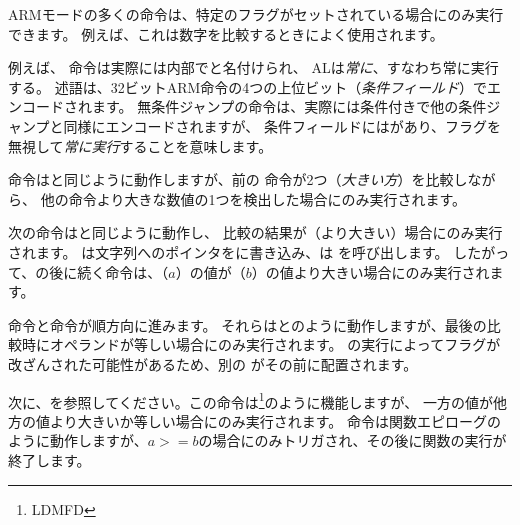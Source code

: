 \label{subsec:jcc_ARM}

\mysubparagraph{\OptimizingKeilVI (\ARMMode)}




ARMモードの多くの命令は、特定のフラグがセットされている場合にのみ実行できます。
例えば、これは数字を比較するときによく使用されます。


例えば、 \ADD 命令は実際には内部でと名付けられ、
ALは\emph{常に}、すなわち常に実行する。
述語は、32ビットARM命令の4つの上位ビット（\emph{条件フィールド}）でエンコードされます。
無条件ジャンプの命令は、実際には条件付きで他の条件ジャンプと同様にエンコードされますが、
条件フィールドにはがあり、フラグを無視して\emph{常に実行}することを意味します。


命令はと同じように動作しますが、前の \CMP 命令が2つ（\emph{大きい方}）を比較しながら、
他の命令より大きな数値の1つを検出した場合にのみ実行されます。


次の命令はと同じように動作し、
比較の結果が（より大きい）場合にのみ実行されます。 
は文字列へのポインタをに書き込み、は \printf を呼び出します。
したがって、の後に続く命令は、（$a$）の値が（$b$）の値より大きい場合にのみ実行されます。


命令と命令が順方向に進みます。
それらはとのように動作しますが、最後の比較時にオペランドが等しい場合にのみ実行されます。 
\printf の実行によってフラグが改ざんされた可能性があるため、別の \CMP がその前に配置されます。


次に、を参照してください。この命令は\footnote{\ac{LDMFD}}のように機能しますが、
一方の値が他方の値より大きいか等しい場合にのみ実行されます。 
命令は関数エピローグのように動作しますが、$a>=b$の場合にのみトリガされ、その後に関数の実行が終了します。

